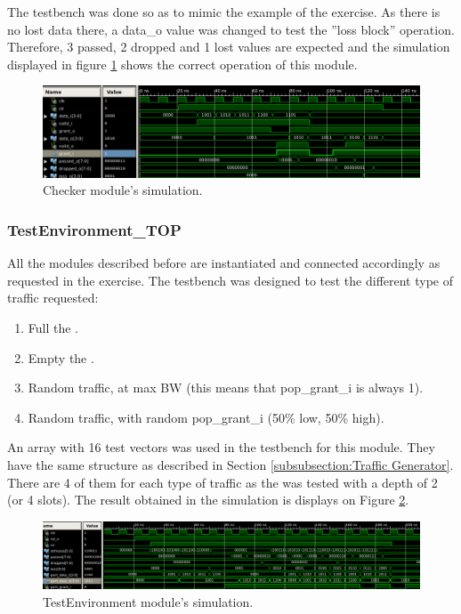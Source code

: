 \documentclass[12pt]{article}
\begin{document}
The testbench was done so as to mimic the example of the exercise.  As there is no lost data there, a data\_o value was changed to test the ''loss block'' operation.  Therefore, 3 passed, 2 dropped and 1 lost values are expected and the simulation displayed in figure \ref{fig:Checker simulation} shows the correct operation of this module.

\begin{figure}[ht]
\centering
\includegraphics[width=15cm]{images/checker-simulation}
\caption{\label{fig:Checker simulation}Checker module's simulation.}
\end{figure}

\subsubsection{TestEnvironment\_TOP}
All the modules described before are instantiated and connected accordingly as requested in the exercise.  The testbench was designed to test the different type of traffic requested:

\begin{enumerate}
	\item Full the \fifo.
	\item Empty the \fifo.
	\item Random traffic, at max BW (this means that pop\_grant\_i is always 1).
	\item Random traffic, with random pop\_grant\_i (50\% low, 50\% high).
\end{enumerate}

An array with 16 test vectors was used in the testbench for this module.  They have the same structure as described in Section \ref{subsubsection:Traffic Generator}.  There are 4 of them for each type of traffic as the \fifo was tested with a depth of 2 (or 4 slots).  The result obtained in the simulation is displays on Figure \ref{fig: TestEnvironment simulation}.

\begin{figure}
\centering
\includegraphics[width=15cm]{images/testenvironment-simulation}
\caption{\label{fig: TestEnvironment simulation}TestEnvironment module's simulation.}
\end{figure}
\end{document}
